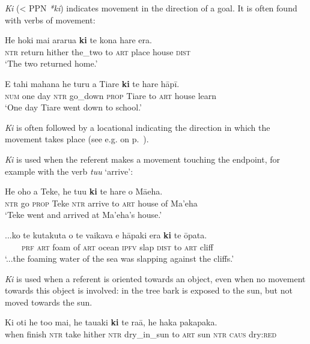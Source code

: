 \textit{Ki} ({\textless} PPN \textit{*ki}) indicates movement in the direction of a goal. It is often found with verbs of movement:

\ea\label{ex:4.261}
\gll He hoki mai ararua \textbf{ki} te kona hare era. \\
\textsc{ntr} return hither the\_two to \textsc{art} place house \textsc{dist} \\

\glt 
‘The two returned home.’ \textstyleExampleref{[R166.007]} 
\z

\ea\label{ex:4.262}
\gll E tahi mahana he turu a Tiare \textbf{ki} te hare hāpī. \\
\textsc{num} one day \textsc{ntr} go\_down \textsc{prop} Tiare to \textsc{art} house learn \\

\glt
‘One day Tiare went down to school.’ \textstyleExampleref{[R170.001]} 
\z

\textit{Ki} is often followed by a locational indicating the direction in which the movement takes place (see e.g.  on p.~\pageref{ex:3.133}). 

\textit{Ki} is used when the referent makes a movement touching the endpoint, for example with the verb \textit{tu{\ꞌ}u} ‘arrive’:

\ea\label{ex:4.263}
\gll He oho a Teke, he tu{\ꞌ}u \textbf{ki} te hare o Mā{\ꞌ}eha. \\
\textsc{ntr} go \textsc{prop} Teke \textsc{ntr} arrive to \textsc{art} house of Ma’eha \\

\glt 
‘Teke went and arrived at Ma’eha’s house.’ \textstyleExampleref{[MsE-059.005]}
\z

\ea\label{ex:4.264}
\gll ...ko te kutakuta o te vaikava e hāpaki era \textbf{ki} te {\ꞌ}ōpata.\\
~~~~\textsc{prf} \textsc{art} foam of \textsc{art} ocean \textsc{ipfv} slap \textsc{dist} to \textsc{art} cliff\\

\glt 
‘...the foaming water of the sea was slapping against the cliffs.’ \textstyleExampleref{[R408.105]} 
\z

\textit{Ki} is used when a referent is oriented towards an object, even when no movement towards this object is involved: in  the tree bark is exposed to the sun, but not moved towards the sun.

\ea\label{ex:4.265}
\gll Ki oti he to{\ꞌ}o mai, he tauaki \textbf{ki} te ra{\ꞌ}ā, he haka pakapaka. \\
when finish \textsc{ntr} take hither \textsc{ntr} dry\_in\_sun to \textsc{art} sun \textsc{ntr} \textsc{caus} dry:\textsc{red} \\

